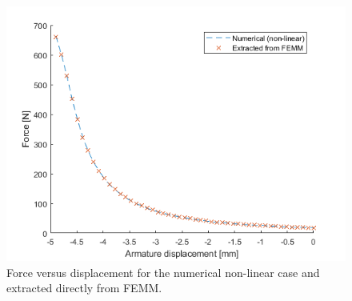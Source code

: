 \documentclass[a4paper]{IEEEtran}
\begin{document}
    \begin{figure}[ht]
        \includegraphics[width = \linewidth]{F-x-FEMM.png}
        \caption{Force versus displacement for the numerical non-linear case and extracted directly from FEMM.}
        \label{forceFEMM} 
    \end{figure}
\end{document}

